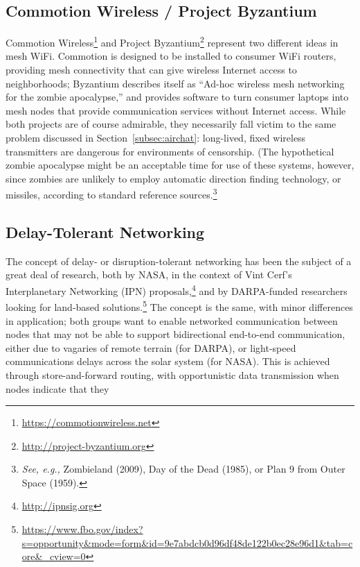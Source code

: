 \documentclass[12pt]{article}
\begin{document}
  \subsection{Commotion Wireless / Project Byzantium}
  
  Commotion Wireless\footnote{\url{https://commotionwireless.net}} and Project Byzantium\footnote{\url{http://project-byzantium.org}} represent two different ideas in mesh WiFi. Commotion is designed to be installed to consumer WiFi routers, providing mesh connectivity that can give wireless Internet access to neighborhoods; Byzantium describes itself as ``Ad-hoc wireless mesh networking for the zombie apocalypse,'' and provides software to turn consumer laptops into mesh nodes that provide communication services without Internet access. While both projects are of course admirable, they necessarily fall victim to the same problem discussed in Section~\ref{subsec:airchat}: long-lived, fixed wireless transmitters are dangerous for environments of censorship. (The hypothetical zombie apocalypse might be an acceptable time for use of these systems, however, since zombies are unlikely to employ automatic direction finding technology, or missiles, according to standard reference sources.\footnote{\emph{See, e.g.,} Zombieland (2009), Day of the Dead (1985), or Plan 9 from Outer Space (1959).}
  
  \subsection{Delay-Tolerant Networking}
  \label{subsec:dtn}
  
  The concept of delay- or disruption-tolerant networking has been the subject of a great deal of research, both by NASA, in the context of Vint Cerf's Interplanetary Networking (IPN) proposals,\footnote{\url{http://ipnsig.org}} and by DARPA-funded researchers looking for land-based solutions.\footnote{\url{https://www.fbo.gov/index?s=opportunity&mode=form&id=9e7abdcb0d96df48de122b0ec28e96d1&tab=core&_cview=0}} The concept is the same, with minor differences in application; both groups want to enable networked communication between nodes that may not be able to support bidirectional end-to-end communication, either due to vagaries of remote terrain (for DARPA), or light-speed communications delays across the solar system (for NASA). This is achieved through store-and-forward routing, with opportunistic data transmission when nodes indicate that they
  
\end{document}
